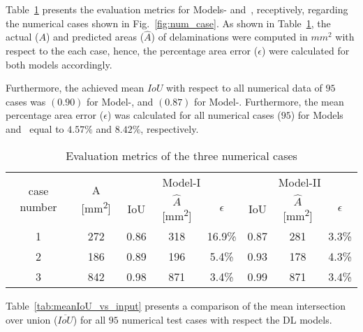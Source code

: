 Table~\ref{tab:num_cases} presents the evaluation metrics for Models- and~, receptively, regarding the numerical cases shown in Fig.~\ref{fig:num_case}.
As shown in Table~\ref{tab:num_cases}, the actual (\(A\)) and predicted areas (\(\hat{A}\)) of delaminations were computed in \(mm^2\) with respect to the each case, hence, the percentage area error (\(\epsilon\)) were calculated for both models accordingly.

Furthermore, the achieved mean \(IoU\) with respect to all numerical data of \(95\) cases was \((0.90)\) for Model-, and \((0.87)\) for Model-. 
Furthermore, the mean percentage area error (\(\epsilon\)) was calculated for all numerical cases (\(95\)) for Models~ and~ equal to \(4.57 \%\) and \(8.42\%\), respectively.
\begin{table}[]
	\caption{Evaluation metrics of the three numerical cases}
	\begin{tabular}{cccccccc}
		\toprule
		\multirow{2}{*}{case number} & \multicolumn{1}{c}{\multirow{2}{*}{A [mm\textsuperscript{2}]}} & \multicolumn{3}{c}{Model-I} & \multicolumn{3}{c}{Model-II} \\ \cmidrule(lr){3-5} \cmidrule(lr){6-8} 
		& \multicolumn{1}{c}{}  & \multicolumn{1}{c}{IoU}  & \multicolumn{1}{c}{\(\hat{A}\) [mm\textsuperscript{2}]} & \(\epsilon\) & \multicolumn{1}{c}{IoU}  & \multicolumn{1}{c}{\(\hat{A}\) [mm\textsuperscript{2}]} & \(\epsilon\) \\ 
		\midrule
		1 & 272 & \multicolumn{1}{c}{0.86} & \multicolumn{1}{c}{318} & 16.9\% & \multicolumn{1}{c}{0.87} & \multicolumn{1}{c}{281} & 3.3\% \\ 
		2 &  186  & \multicolumn{1}{c}{0.89} & \multicolumn{1}{c}{196} & 5.4\% & \multicolumn{1}{c}{0.93} & \multicolumn{1}{c}{178} & 4.3\% \\ 
		3 & 842 & \multicolumn{1}{c}{0.98} &\multicolumn{1}{c}{871} & 3.4\%   & \multicolumn{1}{c}{0.99} & \multicolumn{1}{c}{871} & 3.4\% \\ 
		\bottomrule
	\end{tabular}	
	\label{tab:num_cases}
\end{table}
Table~\ref{tab:meanIoU_vs_input} presents a comparison of the mean intersection over union (\(\overline{IoU}\)) for all \(95\) numerical test cases with respect the DL models.
